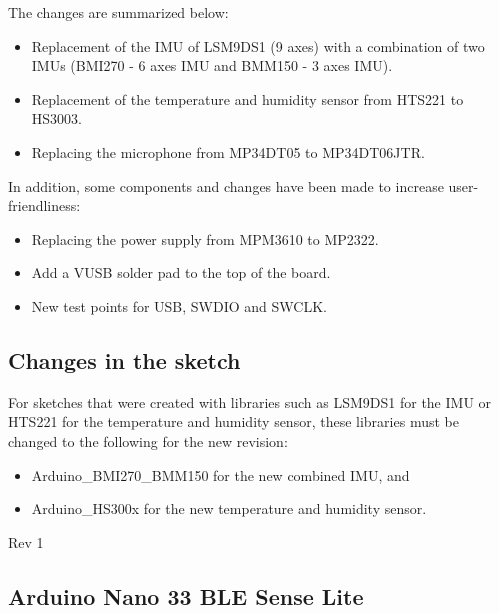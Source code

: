 \bigskip


The changes are summarized below:

\begin{itemize}
    \item Replacement of the IMU of LSM9DS1 (9 axes) with a combination of two IMUs (BMI270 - 6 axes IMU and BMM150 - 3 axes IMU).
    \item Replacement of the temperature and humidity sensor from HTS221 to HS3003.
    \item Replacing the microphone from MP34DT05 to MP34DT06JTR.
\end{itemize}

\bigskip
    
In addition, some components and changes have been made to increase user-friendliness:


\begin{itemize}
    \item Replacing the power supply from MPM3610 to MP2322.
    \item Add a VUSB solder pad to the top of the board.
    \item New test points for USB, SWDIO and SWCLK.
\end{itemize}

\bigskip

\subsection{Changes in the sketch}


For sketches that were created with libraries such as LSM9DS1 for the IMU or HTS221 for the temperature and humidity sensor, these libraries must be changed to the following for the new revision: 

\begin{itemize}
    \item Arduino\_BMI270\_BMM150 for the new combined IMU, and
    \item Arduino\_HS300x for the new temperature and humidity sensor.
\end{itemize}

\bigskip

Rev 1


\subsection{Arduino Nano 33 BLE Sense Lite}


